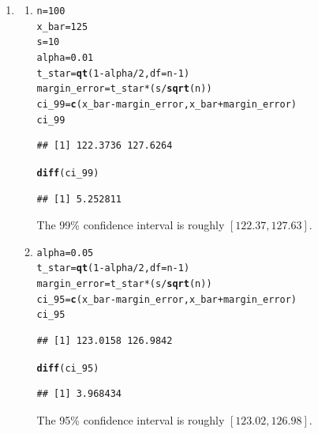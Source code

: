 \documentclass[12pt,a4paper]{article}\usepackage[]{graphicx}\usepackage[]{xcolor}
\makeatletter
\newcommand{\hlnum}[1]{\textcolor[rgb]{0.686,0.059,0.569}{#1}}%
\newcommand{\hlopt}[1]{\textcolor[rgb]{0,0,0}{#1}}%
\newcommand{\hldef}[1]{\textcolor[rgb]{0.345,0.345,0.345}{#1}}%
\newcommand{\hlkwb}[1]{\textcolor[rgb]{0.69,0.353,0.396}{#1}}%
\newcommand{\hlkwc}[1]{\textcolor[rgb]{0.333,0.667,0.333}{#1}}%
\newcommand{\hlkwd}[1]{\textcolor[rgb]{0.737,0.353,0.396}{\textbf{#1}}}%
\newenvironment{kframe}{%
 \def\at@end@of@kframe{}%
 \ifinner\ifhmode%
  \def\at@end@of@kframe{\end{minipage}}%
  \begin{minipage}{\columnwidth}%
 \fi\fi%
 \def\FrameCommand##1{\hskip\@totalleftmargin \hskip-\fboxsep
 \colorbox{shadecolor}{##1}\hskip-\fboxsep
     \hskip-\linewidth \hskip-\@totalleftmargin \hskip\columnwidth}%
 \MakeFramed {\advance\hsize-\width
   \@totalleftmargin\z@ \linewidth\hsize
   \@setminipage}}%
 {\par\unskip\endMakeFramed%
 \at@end@of@kframe}
\newenvironment{knitrout}{}{} %
\makeatother
\begin{document}
\begin{enumerate}[label=\arabic*.]
    \item 
    \begin{enumerate}[label=(\alph*)]
        \item 
\begin{knitrout}
\color{fgcolor}\begin{kframe}
\begin{alltt}
\hldef{n} \hlkwb{=} \hlnum{100}
\hldef{x_bar} \hlkwb{=} \hlnum{125}
\hldef{s} \hlkwb{=} \hlnum{10}
\hldef{alpha} \hlkwb{=} \hlnum{0.01}
\hldef{t_star} \hlkwb{=} \hlkwd{qt}\hldef{(}\hlnum{1} \hlopt{-} \hldef{alpha}\hlopt{/}\hlnum{2}\hldef{,} \hlkwc{df} \hldef{= n} \hlopt{-} \hlnum{1}\hldef{)}
\hldef{margin_error} \hlkwb{=} \hldef{t_star} \hlopt{*} \hldef{(s} \hlopt{/} \hlkwd{sqrt}\hldef{(n))}
\hldef{ci_99} \hlkwb{=} \hlkwd{c}\hldef{(x_bar} \hlopt{-} \hldef{margin_error, x_bar} \hlopt{+} \hldef{margin_error)}
\hldef{ci_99}
\end{alltt}
\begin{verbatim}
## [1] 122.3736 127.6264
\end{verbatim}
\begin{alltt}
        \hlkwd{diff}\hldef{(ci_99)}
\end{alltt}
\begin{verbatim}
## [1] 5.252811
\end{verbatim}
\end{kframe}
\end{knitrout}
        The 99\% confidence interval is roughly $[122.37, 127.63]$.
        \item 
\begin{knitrout}
\color{fgcolor}\begin{kframe}
\begin{alltt}
\hldef{alpha} \hlkwb{=} \hlnum{0.05}
\hldef{t_star} \hlkwb{=} \hlkwd{qt}\hldef{(}\hlnum{1} \hlopt{-} \hldef{alpha}\hlopt{/}\hlnum{2}\hldef{,} \hlkwc{df} \hldef{= n} \hlopt{-} \hlnum{1}\hldef{)}
\hldef{margin_error} \hlkwb{=} \hldef{t_star} \hlopt{*} \hldef{(s} \hlopt{/} \hlkwd{sqrt}\hldef{(n))}
\hldef{ci_95} \hlkwb{=} \hlkwd{c}\hldef{(x_bar} \hlopt{-} \hldef{margin_error, x_bar} \hlopt{+} \hldef{margin_error)}
\hldef{ci_95}
\end{alltt}
\begin{verbatim}
## [1] 123.0158 126.9842
\end{verbatim}
\begin{alltt}
        \hlkwd{diff}\hldef{(ci_95)}
\end{alltt}
\begin{verbatim}
## [1] 3.968434
\end{verbatim}
\end{kframe}
\end{knitrout}
        The 95\% confidence interval is roughly $[123.02, 126.98]$.
        

\end{enumerate}
\end{enumerate}
\end{document}
